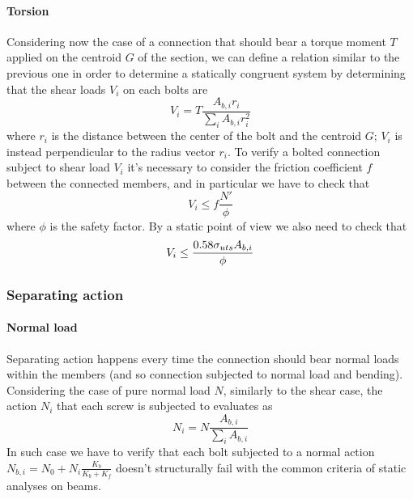 	\paragraph{Torsion} Considering now the case of a connection that should bear a torque moment $T$ applied on the centroid $G$ of the section, we can define a relation similar to the previous one in order to determine a statically congruent system by determining that the shear loads $V_i$ on each bolts are 
	\begin{equation} \label{eq:slidetorsion}
		V_i = T \frac{A_{b,i}r_i}{\sum_i A_{b,i} r_i^2}
	\end{equation}
	where $r_i$ is the distance between the center of the bolt and the centroid $G$; $V_i$ is instead perpendicular to the radius vector $r_i$. To verify a bolted connection subject to shear load $V_i$ it's necessary to consider the friction coefficient $f$ between the connected members, and in particular we have to check that
	\begin{equation}
		V_i \leq f \frac{N'}{\phi} 
	\end{equation}
	where $\phi$ is the safety factor. By a static point of view we also need to check that
	\begin{equation} \label{eq:shearresistance}
		V_i \leq \frac{0.58 \sigma_{uts} A_{b,i}}{\phi}
	\end{equation}
	
\subsubsection*{Separating action}
	\paragraph{Normal load} Separating action happens every time the connection should bear normal loads within the members (and so connection subjected to normal load and bending). Considering the case of pure normal load $N$, similarly to the shear case, the action $N_i$ that each screw is subjected to evaluates as
	\begin{equation}
		N_i = N  \frac {A_{b,i}}{\sum_i A_{b,i}}
	\end{equation}
	In such case we have to verify that each bolt subjected to a normal action $N_{b,i} = N_0 + N_i \frac{K_b}{K_b+K_f}$ doesn't structurally fail with the common criteria of static analyses on beams. 
	
	
	
